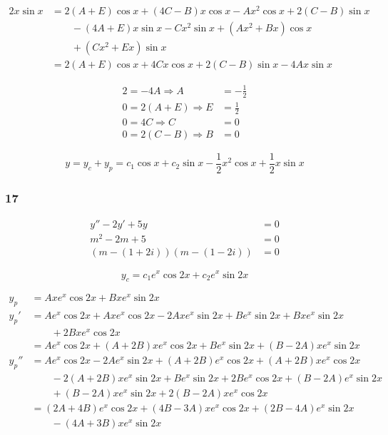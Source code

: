 \documentclass{article}
\begin{document}
\begin{align*}
  2x \sin x & = 2 (A + E) \cos x + (4C - B) x \cos x - Ax^2 \cos x + 2 (C - B) \sin x \\
            & \qquad - (4A + E) x \sin x - C x^2 \sin x + (Ax^2 + Bx) \cos x          \\
            & \qquad + (Cx^2 + Ex) \sin x                                             \\
            & = 2 (A + E) \cos x + 4C x \cos x + 2 (C - B) \sin x - 4A x \sin x
\end{align*}

\begin{align*}
  2 = -4A \Rightarrow A       & = -\frac{1}{2} \\
  0 = 2 (A + E) \Rightarrow E & = \frac{1}{2}  \\
  0 = 4C \Rightarrow C        & = 0            \\
  0 = 2 (C - B) \Rightarrow B & = 0
\end{align*}

\[y = y_c + y_p = c_1 \cos x + c_2 \sin x - \frac{1}{2} x^2 \cos x + \frac{1}{2} x \sin x\]

\subsubsection{17}

\begin{align*}
  y'' - 2y' + 5y                & = 0 \\
  m^2 - 2m + 5                  & = 0 \\
  (m - (1 + 2i)) (m - (1 - 2i)) & = 0
\end{align*}

\[y_c = c_1 e^x \cos 2x + c_2 e^x \sin 2x\]

\begin{align*}
  y_p   & = A x e^x \cos 2x + B x e^x \sin 2x                                                       \\
  y_p'  & = A e^x \cos 2x + A x e^x \cos 2x - 2 A x e^x \sin 2x + B e^x \sin 2x + B x e^x \sin 2x   \\
        & \qquad + 2 B x e^x \cos 2x                                                                \\
        & = A e^x \cos 2x + (A + 2B) x e^x \cos 2x + B e^x \sin 2x + (B - 2A) x e^x \sin 2x         \\
  y_p'' & = A e^x \cos 2x - 2 A e^x \sin 2x + (A + 2B) e^x \cos 2x + (A + 2B) x e^x \cos 2x         \\
        & \qquad - 2 (A + 2B) x e^x \sin 2x + B e^x \sin 2x + 2B e^x \cos 2x + (B - 2A) e^x \sin 2x \\
        & \qquad + (B - 2A) x e^x \sin 2x + 2 (B - 2A) x e^x \cos 2x                                \\
        & = (2A + 4B) e^x \cos 2x + (4B - 3A) x e^x \cos 2x + (2B - 4A) e^x \sin 2x                 \\
        & \qquad - (4A + 3B) x e^x \sin 2x
\end{align*}
\end{document}
